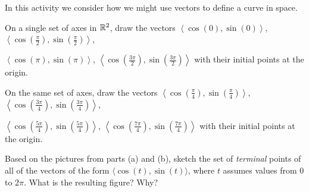 \begin{pa} \label{PA:9.6} In this activity we consider how we might use vectors to define a curve in space.
    \ba
    \item On a single set of axes in $\mathbb{R}^2$, draw the vectors $\left\langle \cos(0), \sin(0) \right\rangle$, $\left\langle \cos\left(\frac{\pi}{2}\right), \sin\left(\frac{\pi}{2}\right) \right\rangle$, 
    
     $\left\langle \cos\left(\pi\right), \sin\left(\pi\right) \right\rangle$,   $\left\langle \cos\left(\frac{3\pi}{2}\right), \sin\left(\frac{3\pi}{2}\right) \right\rangle$ with their initial points at the origin.


    \item On the same set of axes, draw the vectors $\left\langle \cos\left(\frac{\pi}{4}\right), \sin\left(\frac{\pi}{4}\right) \right\rangle$, $\left\langle \cos\left(\frac{3\pi}{4}\right), \sin\left(\frac{3\pi}{4}\right) \right\rangle$, 
    
     $\left\langle \cos\left(\frac{5\pi}{4}\right), \sin\left(\frac{5\pi}{4}\right) \right\rangle$,   $\left\langle \cos\left(\frac{7\pi}{4}\right), \sin\left(\frac{7\pi}{4}\right) \right\rangle$ with their initial points at the origin.



   \item Based on the pictures from parts (a) and (b), sketch the set
     of \emph{terminal} points of all of the vectors of the form
     $\langle \cos(t), \sin(t) \rangle$, where $t$ assumes values from
     0 to $2 \pi$. What is the resulting figure? Why?


    \ea

\end{pa} 

